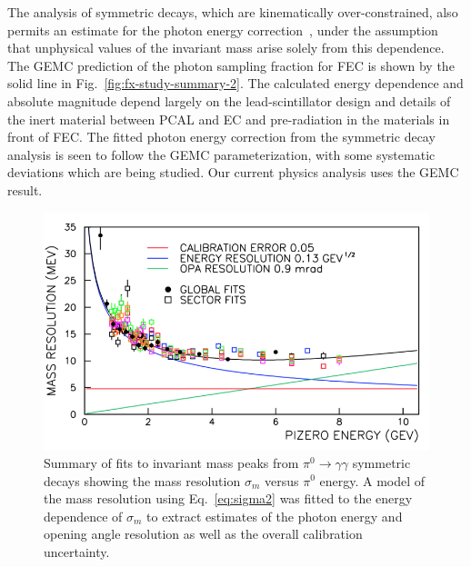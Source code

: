 The analysis of symmetric decays, which are kinematically over-constrained, also permits an estimate for the photon energy correction~\cite{2006015}, under the assumption that unphysical values of the invariant mass arise solely from this dependence.  The GEMC prediction of the photon sampling fraction for FEC is shown by the solid line in Fig.~\ref{fig:fx-study-summary-2}.   The calculated energy dependence and absolute magnitude depend largely on the lead-scintillator design and details of the inert material between PCAL and EC and pre-radiation in the materials in front of FEC.  The fitted photon energy correction from the symmetric decay analysis is seen to follow the GEMC parameterization, with some systematic deviations which are being studied.  Our current physics analysis uses the GEMC result.


\begin{figure}[h]
\centering
\includegraphics[width=1.0\columnwidth,keepaspectratio]{img/fx-study-summary.png}
\caption[]{Summary of fits to invariant mass peaks from $\pi^0 \rightarrow \gamma \gamma$ symmetric decays showing the mass resolution $\sigma_m$ versus $\pi^0$ energy.  A model of the mass resolution using Eq.~\ref{eq:sigma2} was fitted to the energy dependence of $\sigma_m$ to extract estimates of the photon energy and opening angle resolution as well as the overall calibration uncertainty.}
\label{fig:fx-study-summary}
\end{figure}

